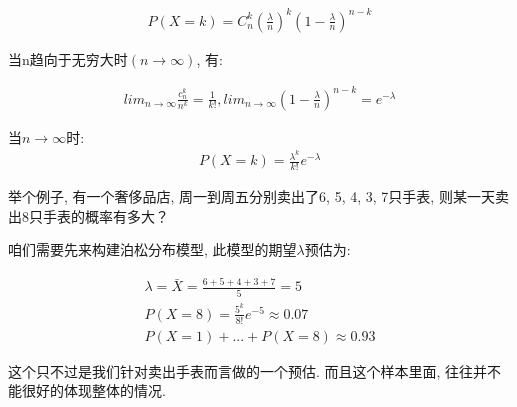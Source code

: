 \begin{align*}
  P(X=k) = C_n^k(\frac{\lambda}{n})^k(1-\frac{\lambda}{n})^{n-k}
\end{align*}

当n趋向于无穷大时$(n \to \infty)$, 有:

\begin{align*}
  lim_{n\to \infty}\frac{c_n^k}{n^k}=\frac{1}{k!}, lim_{n\to \infty}(1-\frac{\lambda}{n})^{n-k} = e^{-\lambda}
\end{align*}

当$n \to \infty$时:
\begin{align*}
  P(X=k) = \frac{\lambda^k}{k!}e^{-\lambda}
\end{align*}

举个例子, 有一个奢侈品店, 周一到周五分别卖出了6, 5, 4, 3, 7只手表, 则某一天卖出8只手表的概率有多大？

咱们需要先来构建泊松分布模型, 此模型的期望$\lambda$预估为: 

\begin{align*}
  \lambda = \bar X = \frac{6+5+4+3+7}{5} = 5 \\
  P(X=8)=\frac{5^k}{8!}e^{-5}\approx0.07 \\
  P(X=1)+...+P(X=8) \approx 0.93
\end{align*}

这个只不过是我们针对卖出手表而言做的一个预估. 而且这个样本里面, 往往并不能很好的体现整体的情况. 